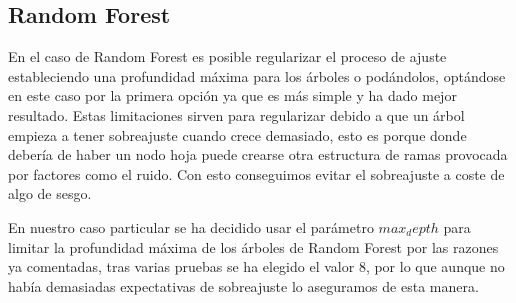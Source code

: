 \documentclass{article}
\begin{document}
	\subsection{Random Forest}
	En el caso de Random Forest es posible regularizar el proceso de ajuste estableciendo una profundidad máxima para los árboles o podándolos, optándose en este caso por la primera opción ya que es más simple y ha dado mejor resultado. Estas limitaciones sirven para regularizar debido a que un árbol empieza a tener sobreajuste cuando crece demasiado, esto es porque donde debería de haber un nodo hoja puede crearse otra estructura de ramas provocada por factores como el ruido. Con esto conseguimos evitar el sobreajuste a coste de algo de sesgo.
	\par
	En nuestro caso particular se ha decidido usar el parámetro $max_depth$ para limitar la profundidad máxima de los árboles de Random Forest por las razones ya comentadas, tras varias pruebas se ha elegido el valor 8, por lo que aunque no había demasiadas expectativas de sobreajuste lo aseguramos de esta manera.
	
\end{document}
